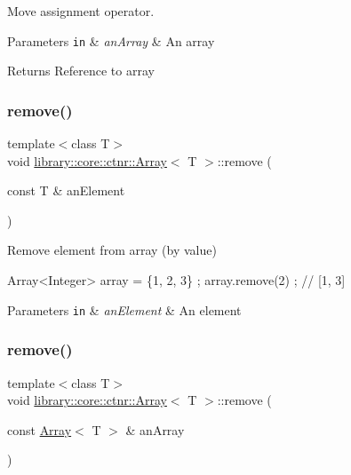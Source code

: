Move assignment operator. 


\begin{DoxyParams}[1]{Parameters}
\mbox{\tt in}  & {\em an\+Array} & An array \\
\hline
\end{DoxyParams}
\begin{DoxyReturn}{Returns}
Reference to array 
\end{DoxyReturn}
\mbox{\label{classlibrary_1_1core_1_1ctnr_1_1_array_a8e295703797d6e41dad7a45e4101a6db}} 
\subsubsection{\texorpdfstring{remove()}{remove()}\hspace{0.1cm}{\footnotesize\ttfamily [1/2]}}
{\footnotesize\ttfamily template$<$class T$>$ \\
void \hyperlink{classlibrary_1_1core_1_1ctnr_1_1_array}{library\+::core\+::ctnr\+::\+Array}$<$ T $>$\+::remove (\begin{DoxyParamCaption}\item[{const T \&}]{an\+Element }\end{DoxyParamCaption})}



Remove element from array (by value) 


\begin{DoxyCode}
Array<Integer> array = \{1, 2, 3\} ;
array.remove(2) ; \textcolor{comment}{// [1, 3]}
\end{DoxyCode}



\begin{DoxyParams}[1]{Parameters}
\mbox{\tt in}  & {\em an\+Element} & An element \\
\hline
\end{DoxyParams}
\mbox{\label{classlibrary_1_1core_1_1ctnr_1_1_array_ab37ca6fc14eefd1336544e05ba1b4d0e}} 
\subsubsection{\texorpdfstring{remove()}{remove()}\hspace{0.1cm}{\footnotesize\ttfamily [2/2]}}
{\footnotesize\ttfamily template$<$class T$>$ \\
void \hyperlink{classlibrary_1_1core_1_1ctnr_1_1_array}{library\+::core\+::ctnr\+::\+Array}$<$ T $>$\+::remove (\begin{DoxyParamCaption}\item[{const \hyperlink{classlibrary_1_1core_1_1ctnr_1_1_array}{Array}$<$ T $>$ \&}]{an\+Array }\end{DoxyParamCaption})}



